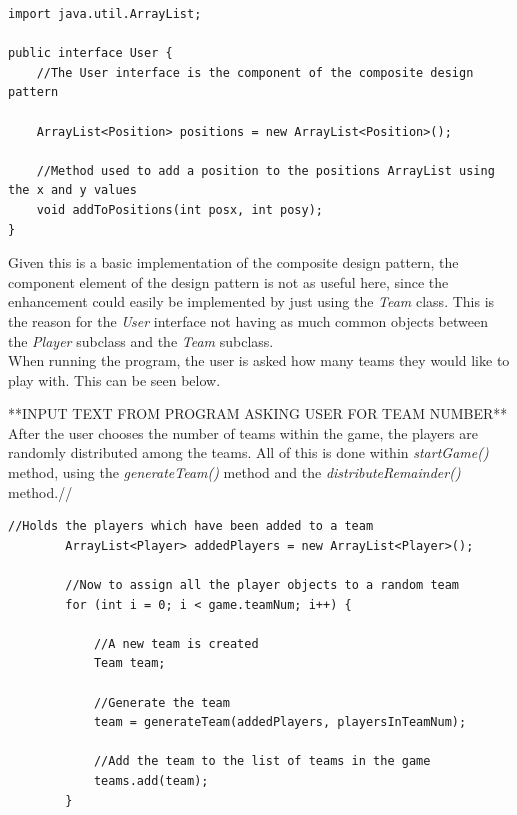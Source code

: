\documentclass[a4paper,12pt]{extarticle}
\begin{document}
\vspace{-1mm}
\begin{lstlisting}
import java.util.ArrayList;

public interface User {
    //The User interface is the component of the composite design pattern

    ArrayList<Position> positions = new ArrayList<Position>();

    //Method used to add a position to the positions ArrayList using the x and y values
    void addToPositions(int posx, int posy);
}
\end{lstlisting}
\vspace{-1mm}

\noindent Given this is a basic implementation of the composite design pattern, the component element of the design pattern is not as useful here, since the enhancement could easily be implemented by just using the \textit{Team} class. This is the reason for the \textit{User} interface not having as much common objects between the \textit{Player} subclass and the \textit{Team} subclass.\\

\noindent When running the program, the user is asked how many teams they would like to play with. This can be seen below.

**INPUT TEXT FROM PROGRAM ASKING USER FOR TEAM NUMBER**\\

\noindent After the user chooses the number of teams within the game, the players are randomly distributed among the teams. All of this is done within \textit{startGame()} method, using the \textit{generateTeam()} method and the \textit{distributeRemainder()} method.//

\begin{lstlisting}
//Holds the players which have been added to a team
        ArrayList<Player> addedPlayers = new ArrayList<Player>();

        //Now to assign all the player objects to a random team
        for (int i = 0; i < game.teamNum; i++) {

            //A new team is created
            Team team;

            //Generate the team
            team = generateTeam(addedPlayers, playersInTeamNum);

            //Add the team to the list of teams in the game
            teams.add(team);
        }
\end{lstlisting}
\vspace{-1mm}
\end{document}
